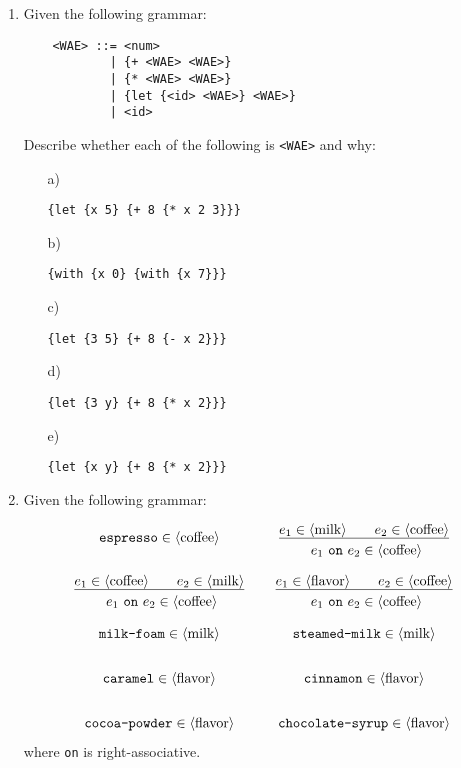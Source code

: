 \begin{enumerate}
\item Given the following grammar:
%
\begin{verbatim}
    <WAE> ::= <num>
            | {+ <WAE> <WAE>}
            | {* <WAE> <WAE>}
            | {let {<id> <WAE>} <WAE>}
            | <id>
\end{verbatim}
%
Describe whether each of the following is \verb+<WAE>+ and why:

\begin{itemize}
\item[a)]
\begin{verbatim}
{let {x 5} {+ 8 {* x 2 3}}}
\end{verbatim}

\item[b)]
\begin{verbatim}
{with {x 0} {with {x 7}}}
\end{verbatim}

\item[c)]
\begin{verbatim}
{let {3 5} {+ 8 {- x 2}}}
\end{verbatim}

\item[d)]
\begin{verbatim}
{let {3 y} {+ 8 {* x 2}}}
\end{verbatim}

\item[e)]
\begin{verbatim}
{let {x y} {+ 8 {* x 2}}}
\end{verbatim}
\end{itemize}

\item Given the following grammar:
%
\newcommand{\BNF}[1]{$\langle$#1$\rangle$}
\newcommand{\coffee}{\mbox{\BNF{coffee}}}
\newcommand{\milk}{\mbox{\BNF{milk}}}
\newcommand{\flavor}{\mbox{\BNF{flavor}}}

\[
\begin{array}{ccc}
{\texttt{espresso} \in \coffee}
&&
\newinfrule
{e_1 \in \milk\qquad
e_2 \in \coffee
}
{\ e_1\ \texttt{on}\ e_2 \in \coffee}
\\[2em]
\newinfrule
{e_1 \in \coffee\qquad
e_2 \in \milk
}
{\ e_1\ \texttt{on}\ e_2 \in \coffee}
&&
\newinfrule
{e_1 \in \flavor \qquad
e_2 \in \coffee
}
{\ e_1\ \texttt{on}\ e_2 \in \coffee}
\\[2em]
{\texttt{milk-foam} \in \milk}
&&
{\texttt{steamed-milk} \in \milk}
\\[2em]
{\texttt{caramel} \in \flavor}
&&
{\texttt{cinnamon} \in \flavor}
\\[2em]
{\texttt{cocoa-powder} \in \flavor}
&&
{\texttt{chocolate-syrup} \in \flavor}
\end{array}
\]
where \texttt{on} is right-associative.


\end{enumerate}
